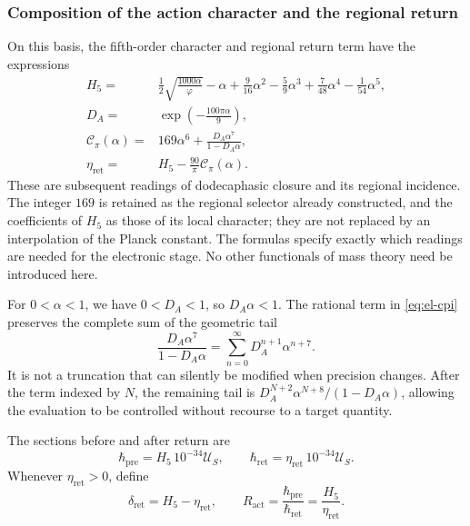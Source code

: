 

\subsubsection{Composition of the action character and the regional return}

On this basis, the fifth-order character and regional return term
have the expressions
\begin{align}
 H_5={}&\frac12\sqrt{\frac{1000\alpha}{\varphi}}-\alpha
   +\frac9{16}\alpha^2-\frac59\alpha^3
   +\frac7{48}\alpha^4-\frac1{54}\alpha^5,
   \label{eq:el-h5}\\
 D_A={}&\exp\!\left(-\frac{100\pi\alpha}{9}\right),
   \label{eq:el-da}\\
 \mathcal C_\pi(\alpha)={}&169\alpha^6+
       \frac{D_A\alpha^7}{1-D_A\alpha},
   \label{eq:el-cpi}\\
 \eta_{\mathrm{ret}}={}&H_5-\frac{90}{\pi}\mathcal C_\pi(\alpha).
   \label{eq:el-eta}
\end{align}
These are subsequent readings of dodecaphasic closure and its
regional incidence. The integer \(169\) is retained as the regional
selector already constructed, and the coefficients of \(H_5\) as those of its
local character; they are not replaced by an interpolation of the Planck
constant. The formulas specify exactly which readings are needed
for the electronic stage. No other functionals of mass theory need
be introduced here.

For \(0<\alpha<1\), we have \(0<D_A<1\), so
\(D_A\alpha<1\). The rational term in \eqref{eq:el-cpi} preserves the
complete sum of the geometric tail
\begin{equation}
 \frac{D_A\alpha^7}{1-D_A\alpha}
 =\sum_{n=0}^{\infty}D_A^{n+1}\alpha^{n+7}.
 \label{eq:el-cola-regional}
\end{equation}
It is not a truncation that can silently be modified when precision
changes. After the term indexed by \(N\), the remaining tail is
\(D_A^{N+2}\alpha^{N+8}/(1-D_A\alpha)\), allowing the evaluation
to be controlled without recourse to a target quantity.

\begin{definition}
The sections before and after return are
\begin{equation}
 \hbar_{\mathrm{pre}}=H_5\,10^{-34}\mathcal U_S,
 \qquad
 \hbar_{\mathrm{ret}}=\eta_{\mathrm{ret}}\,10^{-34}\mathcal U_S.
 \label{eq:el-secciones-accion}
\end{equation}
Whenever \(\eta_{\mathrm{ret}}>0\), define
\begin{equation}
 \delta_{\mathrm{ret}}=H_5-\eta_{\mathrm{ret}},\qquad
 R_{\mathrm{act}}=\frac{\hbar_{\mathrm{pre}}}{\hbar_{\mathrm{ret}}}
 =\frac{H_5}{\eta_{\mathrm{ret}}}.
 \label{eq:el-ratio}
\end{equation}
\end{definition}

